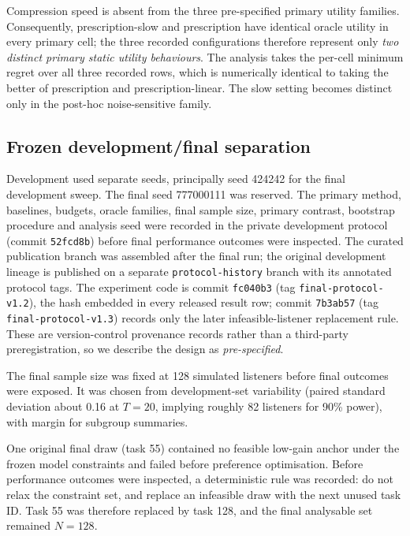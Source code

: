 \documentclass[preprint,12pt]{elsarticle}
\begin{document}
Compression speed is absent from the three pre-specified primary utility families. Consequently, prescription-slow and prescription have identical oracle utility in every primary cell; the three recorded configurations therefore represent only \emph{two distinct primary static utility behaviours}. The analysis takes the per-cell minimum regret over all three recorded rows, which is numerically identical to taking the better of prescription and prescription-linear. The slow setting becomes distinct only in the post-hoc noise-sensitive family.

\subsection{Frozen development/final separation}

Development used separate seeds, principally seed 424242 for the final development sweep. The final seed 777000111 was reserved. The primary method, baselines, budgets, oracle families, final sample size, primary contrast, bootstrap procedure and analysis seed were recorded in the private development protocol (commit \texttt{52fcd8b}) before final performance outcomes were inspected. The curated publication branch was assembled after the final run; the original development lineage is published on a separate \texttt{protocol-history} branch with its annotated protocol tags. The experiment code is commit \texttt{fc040b3} (tag \texttt{final-protocol-v1.2}), the hash embedded in every released result row; commit \texttt{7b3ab57} (tag \texttt{final-protocol-v1.3}) records only the later infeasible-listener replacement rule. These are version-control provenance records rather than a third-party preregistration, so we describe the design as \emph{pre-specified}.

The final sample size was fixed at 128 simulated listeners before final outcomes were exposed. It was chosen from development-set variability (paired standard deviation about 0.16 at $T=20$, implying roughly 82 listeners for 90\% power), with margin for subgroup summaries.

One original final draw (task 55) contained no feasible low-gain anchor under the frozen model constraints and failed before preference optimisation. Before performance outcomes were inspected, a deterministic rule was recorded: do not relax the constraint set, and replace an infeasible draw with the next unused task ID. Task 55 was therefore replaced by task 128, and the final analysable set remained $N=128$.
\end{document}

